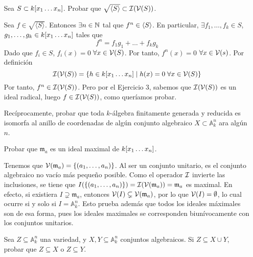 \documentclass[twoside]{article}
\begin{document}
\newpage 
\begin{ejercicio}{4}
Sea $S\subset k[x_1\dotsc x_{n}]$. Probar que $\sqrt{\langle{S}\rangle}\subset \mathcal{I}(\mathcal{V}(S))$.
\begin{solucion}
Sea $f\in \sqrt{\langle{S}\rangle}$. Entonces $\exists n \in \mathbb{N}$ tal que $f^n \in \langle{S}\rangle$. En particular, $\exists f_1,\dotsc,f_k\in S$, $g_1,\dotsc,g_k \in k[x_1\dotsc x_{n}]$ tales que
$$
f^n = f_1 g_1 + \dotsc + f_k g_k 
$$
Dado que $f_i\in S$, $f_i(x)=0$ $\forall x \in \mathcal{V}(S)$. Por tanto, $f^n(x) = 0$ $\forall x \in \mathcal{V}(s)$. Por definición
$$
\mathcal{I}(\mathcal{V}(S)) =  \{ h \in k[x_1\dotsc x_{n}] \mid h(x)=0 \; \forall x\in \mathcal{V}(S)\}
$$
Por tanto, $f^n \in \mathcal{I}(\mathcal{V}(S))$. Pero por el Ejercicio 3, sabemos que $\mathcal{I}(\mathcal{V}(S))$ es un ideal radical, luego $f\in \mathcal{I}(\mathcal{V}(S))$, como queríamos probar.
\end{solucion}
\end{ejercicio}

\newpage 
\begin{ejercicio}{5}
Recíprocamente, probar que toda $k$-álgebra finitamente generada
y reducida es isomorfa al anillo de coordenadas de algún conjunto algebraico $X \subset \mathbb{A}^n_k$ ara algún $n$.\begin{solucion}
\end{solucion}
\end{ejercicio}

\begin{ejercicio}{6}
Probar que $\mathfrak{m}_a$ es un ideal maximal de $k[x_1\dotsc x_{n}]$.
\end{ejercicio}
\begin{solucion}
Tenemos que $\mathcal{V}(\mathfrak{m}_a)=\{(a_1,\dots,a_n)\}$. Al ser un conjunto unitario, es el conjunto algebraico no vacío más pequeño posible. Como el operador $\mathcal{I}$ invierte las inclusiones, se tiene que $I(\{(a_1,\dots,a_n)\})=\mathcal{I}(\mathcal{V}(\mathfrak{m}_a))=\mathfrak{m}_a$ es maximal. En efecto, si existiera $I\supsetneq\mathfrak{m}_a$, entonces $\mathcal{V}(I)\subsetneq \mathcal{V}(\mathfrak{m}_a)$, por lo que $\mathcal{V}(I)=\emptyset$, lo cual ocurre si y solo si $I=\mathbb{A}^n_k$. Esto prueba además que todos los ideales máximales son de esa forma, pues los ideales maximales se corresponden biunívocamente con los conjuntos unitarios.
\end{solucion}

\begin{ejercicio}{7}
Sea $Z ⊆ \mathbb{A}^n_k$
 una variedad, y $X, Y ⊆ \mathbb{A}^n_k$ conjuntos algebraicos.
Si $Z ⊆ X ∪ Y$, probar que $Z ⊆ X$ o $Z ⊆ Y$.
\end{ejercicio}
\begin{solucion}
\end{solucion}
\end{document}
